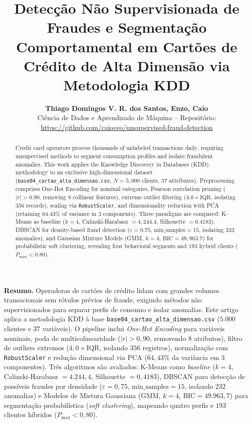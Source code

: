\documentclass[10pt,twocolumn]{article}
\title{\large\textbf{Detecção Não Supervisionada de Fraudes e Segmentação Comportamental em Cartões de Crédito de Alta Dimensão via Metodologia KDD}}
\author{
  \normalsize\textbf{Thiago Domingos V. R. dos Santos, Enzo, Caio}\\
  \small Ciência de Dados e Aprendizado de Máquina -- Repositório: \url{https://github.com/caioceo/unsupervised-fraud-detection}
}
\date{}
\begin{document}
\maketitle
\vspace{-0.4cm}

\begin{abstract}
  \noindent\footnotesize Credit card operators process thousands of unlabeled transactions daily, requiring unsupervised methods to segment consumption profiles and isolate fraudulent anomalies. This work applies the Knowledge Discovery in Databases (KDD) methodology to an exclusive high-dimensional dataset (\texttt{base04\_cartao\_alta\_dimensao.csv}, $N = 5{,}000$ clients, $37$ attributes). Preprocessing comprises One-Hot Encoding for nominal categories, Pearson correlation pruning ($|r| > 0.90$, removing $8$ collinear features), extreme outlier filtering ($4.0 \times \text{IQR}$, isolating $356$ records), scaling via \texttt{RobustScaler}, and dimensionality reduction with PCA (retaining $64.43\%$ of variance in $3$ components). Three paradigms are compared: K-Means as baseline ($k = 4$, Calinski-Harabasz $= 4{,}244.4$, Silhouette $= 0.4183$), DBSCAN for density-based fraud detection ($\varepsilon = 0.75$, $\text{min\_samples} = 15$, isolating $232$ anomalies), and Gaussian Mixture Models (GMM, $k = 4$, $\text{BIC} = 49{,}963.7$) for probabilistic soft clustering, revealing four behavioral segments and $193$ hybrid clients ($P_{\max} < 0.80$).
\end{abstract}

\vspace{0.1cm}
\noindent\footnotesize\textbf{Resumo.}
Operadoras de cartões de crédito lidam com grandes volumes transacionais sem rótulos prévios de fraude, exigindo métodos não supervisionados para separar perfis de consumo e isolar anomalias. Este artigo aplica a metodologia KDD à base \texttt{base04\_cartao\_alta\_dimensao.csv} ($5.000$ clientes e $37$ variáveis). O pipeline inclui \textit{One-Hot Encoding} para variáveis nominais, poda de multicolinearidade ($|r| > 0,90$, removendo $8$ atributos), filtro de outliers extremos ($4,0 \times \text{IQR}$, isolando $356$ registros), normalização com \texttt{RobustScaler} e redução dimensional via PCA ($64,43\%$ da variância em $3$ componentes). Três algoritmos são avaliados: K-Means como \textit{baseline} ($k = 4$, Calinski-Harabasz $= 4.244,4$, Silhouette $= 0,4183$), DBSCAN para detecção de possíveis fraudes por densidade ($\varepsilon = 0,75$, $\text{min\_samples} = 15$, isolando $232$ anomalias) e Modelos de Mistura Gaussiana (GMM, $k = 4$, $\text{BIC} = 49.963,7$) para segmentação probabilística (\textit{soft clustering}), mapeando quatro perfis e $193$ clientes híbridos ($P_{\max} < 0,80$).
\normalsize
\end{document}
